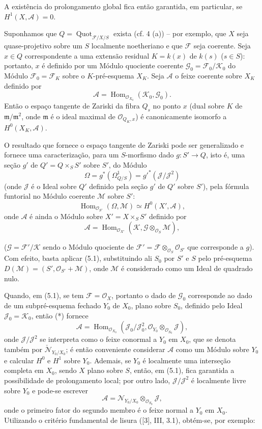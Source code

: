 A existência do prolongamento global fica então garantida, em particular, se
$H^1(X,\mathcal A)=0$.

 Suponhamos que
$Q=\operatorname{Quot}_{\mathcal F/X/S}$ exista (cf. 4 (a)) -- por exemplo,
que $X$ seja quase-projetivo sobre um $S$ localmente noetheriano e que
$\mathcal F$ seja coerente. Seja $x\in Q$ correspondente a uma extensão
residual $K=k(x)$ de $k(s)$ ($s\in S$):
portanto, $x$ é definido por um Módulo quociente coerente
$\mathcal G_0=\mathcal F_0/\mathcal K_0$ do Módulo
$\mathcal F_0=\mathcal F_K$ sobre o $K$-pré-esquema $X_K$. Seja $\mathcal A$
o feixe coerente sobre $X_K$ definido por
\[
\mathcal A=\operatorname{Hom}_{\mathcal O_{X_0}}(\mathcal K_0,\mathcal G_0).
\]
Então o espaço tangente de Zariski da fibra $Q_s$ no ponto $x$ (dual sobre
$K$ de $\mathfrak m/\mathfrak m^2$, onde $\mathfrak m$ é o ideal maximal de
$\mathcal O_{Q_K,x}$) é canonicamente isomorfo a $H^0(X_K,\mathcal A)$.

O resultado que fornece o espaço tangente de Zariski pode ser generalizado e
fornece uma caracterização, para um $S$-morfismo dado
$g:S'\longrightarrow Q$, isto é, uma seção $g'$ de $Q'=Q\times_SS'$ sobre
$S'$, do Módulo
\[
\Omega=g^*(\Omega^1_{Q/S})=g'^*(\mathcal J/\mathcal J^2)
\]
(onde $\mathcal J$ é o Ideal sobre $Q'$ definido pela seção $g'$ de $Q'$ sobre
$S'$), pela fórmula funtorial no Módulo coerente $\mathcal M$ sobre $S'$:
\[
\operatorname{Hom}_{\mathcal O_{S'}}(\Omega,\mathcal M)
\simeq H^0(X',\mathcal A),
\]
onde $\mathcal A$ é ainda o Módulo sobre $X'=X\times_SS'$ definido por
\[
\mathcal A=\operatorname{Hom}_{\mathcal O_{X'}}
(\mathcal K,\mathcal G\otimes_{\mathcal O_S}\mathcal M),
\]

($\mathcal G=\mathcal F'/\mathcal K$ sendo o Módulo quociente de
$\mathcal F'=\mathcal F\otimes_{\mathcal O_S}\mathcal O_{S'}$ que corresponde
a $g$). Com efeito, basta aplicar (5.1), substituindo ali $S_0$ por $S'$ e $S$
pelo pré-esquema $D(\mathcal M)=(S',\mathcal O_{S'}+\mathcal M)$, onde
$\mathcal M$ é considerado como um Ideal de quadrado nulo.

Quando, em (5.1), se tem $\mathcal F=\mathcal O_X$, portanto o dado de
$\mathcal G_0$ corresponde ao dado de um subpré-esquema fechado $Y_0$ de
$X_0$, plano sobre $S_0$, definido pelo Ideal
$\mathcal J_0=\mathcal K_0$, então (*) fornece
\[
\mathcal A=\operatorname{Hom}_{\mathcal O_{X_0}}
(\mathcal J_0/\mathcal J_0^2,
\mathcal O_{Y_0}\otimes_{\mathcal O_{S_0}}\mathcal J),
\]
onde $\mathcal J/\mathcal J^2$ se interpreta como o feixe conormal a $Y_0$ em
$X_0$, que se denota também por
$\check{\mathcal N}_{Y_0/X_0}$; é então conveniente considerar $\mathcal A$
como um Módulo sobre $Y_0$ e calcular $H^0$ e $H^1$ sobre $Y_0$. Ademais, se
$Y_0$ é localmente uma interseção completa em $X_0$, sendo $X$ plano sobre
$S$, então, em (5.1), fica garantida a possibilidade de prolongamento local;
por outro lado, $\mathcal J/\mathcal J^2$ é localmente livre sobre $Y_0$ e
pode-se escrever
\[
\mathcal A=\mathcal N_{Y_0/X_0}\otimes_{\mathcal O_{S_0}}\mathcal J,
\]
onde o primeiro fator do segundo membro é o feixe normal a $Y_0$ em $X_0$.
Utilizando o critério fundamental de lisura ([3], III, 3.1), obtém-se, por
exemplo:

